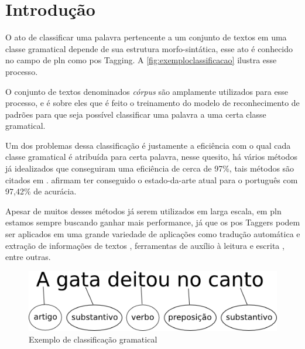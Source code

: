 \chapter{Introdução}\label{introducao}

O ato de classificar uma palavra pertencente a um conjunto de textos em uma classe gramatical depende de sua estrutura morfo-sintática, esse ato é conhecido no campo de \ac{pln} como \ac{pos} Tagging. A \autoref{fig:exemploclassificacao} ilustra esse processo. 

O conjunto de textos denominados \textit{córpus} são amplamente utilizados para esse processo, e é sobre eles que é feito o treinamento do modelo de reconhecimento de padrões para que seja possível classificar uma palavra a uma certa classe gramatical.

Um dos problemas dessa classificação é justamente a eficiência com o qual cada classe gramatical é atribuída para certa palavra, nesse quesito, há vários métodos já idealizados que conseguiram uma eficiência de cerca de 97\%, tais métodos são citados em \cite{dos2014training, collobert2011deep, fonseca2015evaluating}.  afirmam ter conseguido o estado-da-arte atual para o português com 97,42\% de acurácia.

Apesar de muitos desses métodos já serem utilizados em larga escala, em \ac{pln} estamos sempre buscando ganhar mais performance, já que os \ac{pos} Taggers podem ser aplicados em uma grande variedade de aplicações como tradução automática e extração de informações de textos \cite{manning1999foundations}, ferramentas de auxílio à leitura e escrita \cite{marquiafavel2010processo}, entre outras.

\begin{figure}[htb]
  \caption{Exemplo de classificação gramatical}\label{fig:exemploclassificacao}
  \begin{center}
      \includegraphics[scale=0.5]{img/exemplo_classificacao}
  \end{center}
\end{figure}

